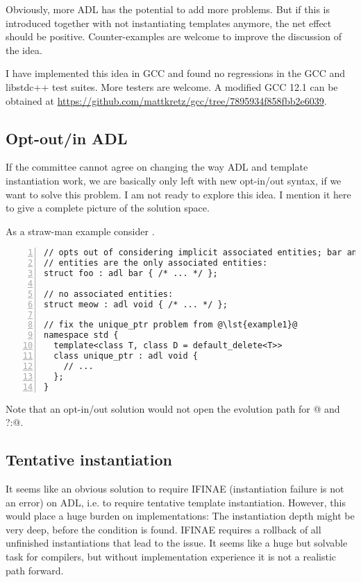Obviously, more ADL has the potential to add more problems. But if this is introduced 
together with not instantiating templates anymore, the net effect should be positive. 
Counter-examples are welcome to improve the discussion of the idea.

I have implemented this idea in GCC and found no regressions in the GCC and libstdc++ test 
suites. More testers are welcome. A modified GCC 12.1 can be obtained at 
\url{https://github.com/mattkretz/gcc/tree/7895934f858fbb2e6039}.

\subsection{Opt-out/in ADL}

If the committee cannot agree on changing the way ADL and template instantiation work, we 
are basically only left with new opt-in/out syntax, if we want to solve this problem. I am 
not ready to explore this idea. I mention it here to give a complete picture of the 
solution space.

As a straw-man example consider .
\begin{lstlisting}[numbers=left,float={hbtp},label=lst:optinoutadl,caption={
Straw-man opt-in/out syntax for ADL
}]
// opts out of considering implicit associated entities; bar and its associated
// entities are the only associated entities:
struct foo : adl bar { /* ... */ };

// no associated entities:
struct meow : adl void { /* ... */ };

// fix the unique_ptr problem from @\lst{example1}@
namespace std {
  template<class T, class D = default_delete<T>>
  class unique_ptr : adl void {
    // ...
  };
}
\end{lstlisting}
Note that an opt-in/out solution would not open the evolution path for 
\codelst@operator[]@ and \codelst@operator?:@.

\subsection{Tentative instantiation}
It seems like an obvious solution to require IFINAE (instantiation failure is not an 
error) on ADL, i.e. to require tentative template instantiation. However, this would place 
a huge burden on implementations: The instantiation depth might be very deep, before the 
condition is found. IFINAE requires a rollback of all unfinished instantiations that lead 
to the issue. It seems like a huge but solvable task for compilers, but without 
implementation experience it is not a realistic path forward.

